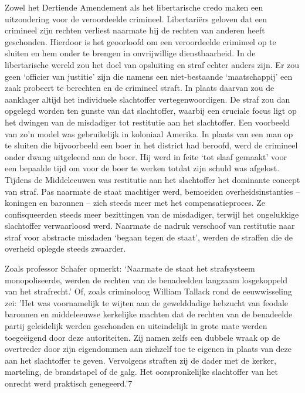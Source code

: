 \documentclass[
  a5paper,
  smalldemyvopaper,10pt,twoside,onecolumn,openright,extrafontsizes,hidelinks]{memoir}
\begin{document}
Zowel het Dertiende Amendement als het libertarische credo maken een
uitzondering voor de veroordeelde crimineel. Libertariërs geloven dat
een crimineel zijn rechten verliest naarmate hij de rechten van anderen
heeft geschonden. Hierdoor is het geoorloofd om een veroordeelde
crimineel op te sluiten en hem onder te brengen in onvrijwillige
dienstbaarheid. In de libertarische wereld zou het doel van opsluiting
en straf echter anders zijn. Er zou geen `officier van justitie' zijn
die namens een niet-bestaande `maatschappij' een zaak probeert te
berechten en de crimineel straft. In plaats daarvan zou de aanklager
altijd het individuele slachtoffer vertegenwoordigen. De straf zou dan
opgelegd worden ten gunste van dat slachtoffer, waarbij een cruciale
focus ligt op het dwingen van de misdadiger tot restitutie aan het
slachtoffer. Een voorbeeld van zo'n model was gebruikelijk in koloniaal
Amerika. In plaats van een man op te sluiten die bijvoorbeeld een boer
in het district had beroofd, werd de crimineel onder dwang uitgeleend
aan de boer. Hij werd in feite `tot slaaf gemaakt' voor een bepaalde
tijd om voor de boer te werken totdat zijn schuld was afgelost. Tijdens
de Middeleeuwen was restitutie aan het slachtoffer het dominante concept
van straf. Pas naarmate de staat machtiger werd, bemoeiden
overheidsinstanties -- koningen en baronnen -- zich steeds meer met het
compensatieproces. Ze confisqueerden steeds meer bezittingen van de
misdadiger, terwijl het ongelukkige slachtoffer verwaarloosd werd.
Naarmate de nadruk verschoof van restitutie naar straf voor abstracte
misdaden `begaan tegen de staat', werden de straffen die de overheid
oplegde steeds zwaarder.

Zoals professor Schafer opmerkt: `Naarmate de staat het strafsysteem
monopoliseerde, werden de rechten van de benadeelden langzaam
losgekoppeld van het strafrecht.' Of, zoals criminoloog William Tallack
rond de eeuwwisseling zei: 'Het was voornamelijk te wijten aan de
gewelddadige hebzucht van feodale baronnen en middeleeuwse kerkelijke
machten dat de rechten van de benadeelde partij geleidelijk werden
geschonden en uiteindelijk in grote mate werden toegeëigend door deze
autoriteiten. Zij namen zelfs een dubbele wraak op de overtreder door
zijn eigendommen aan zichzelf toe te eigenen in plaats van deze aan het
slachtoffer te geven. Vervolgens straften zij de dader met de kerker,
marteling, de brandstapel of de galg. Het oorspronkelijke slachtoffer
van het onrecht werd praktisch genegeerd.'7
\end{document}

